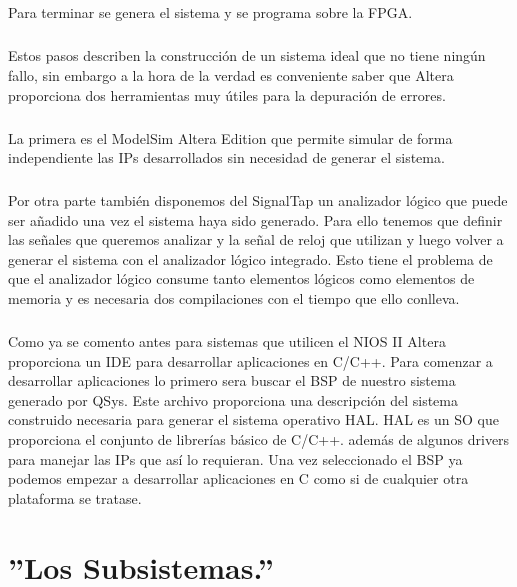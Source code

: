 \documentclass[a4paper,12pt,titlepage,final]{book}
\begin{document}
\paragraph{}
Para terminar se genera el sistema y se programa sobre la FPGA.

\paragraph{}
Estos pasos describen la construcción de un sistema ideal que no tiene ningún fallo, sin embargo a la hora de la verdad es conveniente saber que Altera proporciona dos herramientas muy útiles para la depuración de errores. 

\paragraph{}
La primera es el ModelSim Altera Edition que permite simular de forma independiente las IPs desarrollados sin necesidad de generar el sistema.

\paragraph{}
Por otra parte también disponemos del SignalTap un analizador lógico que puede ser añadido una vez el sistema haya sido generado. Para ello tenemos que definir las señales que queremos analizar y la señal de reloj que utilizan y luego volver a generar el sistema con el analizador lógico integrado. Esto tiene el problema de que el analizador lógico consume tanto elementos lógicos como elementos de memoria y es necesaria dos compilaciones con el tiempo que ello conlleva.

\paragraph{}
Como ya se comento antes para sistemas que utilicen el NIOS II Altera proporciona un IDE para desarrollar aplicaciones en C/C++. Para comenzar a desarrollar aplicaciones lo primero sera buscar el BSP de nuestro sistema generado por QSys. Este archivo proporciona una descripción del sistema construido necesaria para generar el sistema operativo HAL. HAL es un SO que proporciona el conjunto de librerías básico de C/C++. además de algunos drivers para manejar las IPs que así lo requieran. Una vez seleccionado el BSP ya podemos empezar a desarrollar aplicaciones en C como si de cualquier otra plataforma se tratase.

\chapter{''Los Subsistemas.''}
\end{document}
